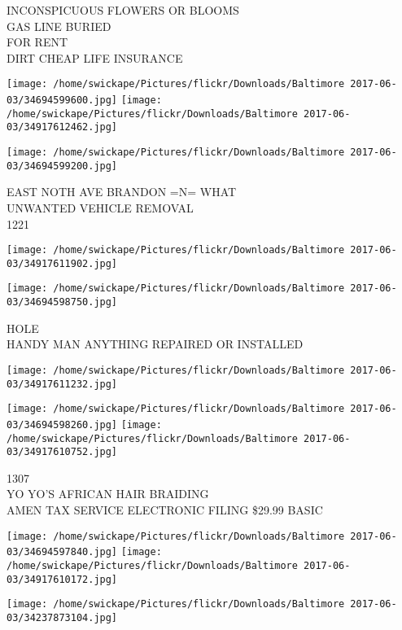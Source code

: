 \documentclass[10pt,letterpaper]{article}
\begin{document}
INCONSPICUOUS FLOWERS OR BLOOMS\\
GAS LINE BURIED\\
FOR RENT\\
DIRT CHEAP LIFE INSURANCE\\
\pagebreak

\texttt{[image: /home/swickape/Pictures/flickr/Downloads/Baltimore 2017-06-03/34694599600.jpg]}
\texttt{[image: /home/swickape/Pictures/flickr/Downloads/Baltimore 2017-06-03/34917612462.jpg]}

\vspace{0.25in}
\texttt{[image: /home/swickape/Pictures/flickr/Downloads/Baltimore 2017-06-03/34694599200.jpg]}

EAST NOTH AVE BRANDON =N= WHAT\\
UNWANTED VEHICLE REMOVAL\\
1221\\
\pagebreak

\texttt{[image: /home/swickape/Pictures/flickr/Downloads/Baltimore 2017-06-03/34917611902.jpg]}

\vspace{0.25in}
\texttt{[image: /home/swickape/Pictures/flickr/Downloads/Baltimore 2017-06-03/34694598750.jpg]}

HOLE\\
HANDY MAN ANYTHING REPAIRED OR INSTALLED\\
\pagebreak

\texttt{[image: /home/swickape/Pictures/flickr/Downloads/Baltimore 2017-06-03/34917611232.jpg]}

\vspace{0.25in}
\texttt{[image: /home/swickape/Pictures/flickr/Downloads/Baltimore 2017-06-03/34694598260.jpg]}
\texttt{[image: /home/swickape/Pictures/flickr/Downloads/Baltimore 2017-06-03/34917610752.jpg]}

1307\\
YO YO'S AFRICAN HAIR BRAIDING\\
AMEN TAX SERVICE ELECTRONIC FILING \$29.99 BASIC\\
\pagebreak

\texttt{[image: /home/swickape/Pictures/flickr/Downloads/Baltimore 2017-06-03/34694597840.jpg]}
\texttt{[image: /home/swickape/Pictures/flickr/Downloads/Baltimore 2017-06-03/34917610172.jpg]}

\texttt{[image: /home/swickape/Pictures/flickr/Downloads/Baltimore 2017-06-03/34237873104.jpg]}
\end{document}
